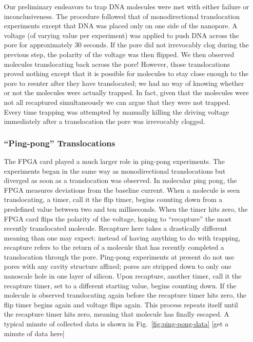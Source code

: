 \documentclass[aps,prl,preprint,groupedaddress]{revtex4}
\begin{document}
Our preliminary endeavors to trap DNA molecules were met with either failure or inconclusiveness.
The procedure followed that of monodirectional translocation experiments except that DNA was placed only on one side of the nanopore.
A voltage (of varying value per experiment) was applied to push DNA across the pore for approximately 30 seconds.
If the pore did not irrevocably clog during the previous step, the polarity of the voltage was then flipped.
We then observed molecules translocating back across the pore!
However, those translocations proved nothing except that it is possible for molecules to stay close enough to the pore to reenter after they have translocated; we had no way of knowing whether or not the molecules were actually trapped.
In fact, given that the molecules were not all recaptured simultaneously we can argue that they were not trapped.
Every time trapping was attempted by manually killing the driving voltage immediately after a translocation the pore was irrevocably clogged.

\subsubsection{``Ping-pong'' Translocations}

The FPGA card played a much larger role in ping-pong experiments.
The experiments began in the same way as monodirectional translocations but diverged as soon as a translocation was observed.
In molecular ping pong, the FPGA measures deviations from the baseline current.
When a molecule is seen translocating, a timer, call it the flip timer, begins counting down from a predefined value between two and ten milliseconds.
When the timer hits zero, the FPGA card flips the polarity of the voltage, hoping to ``recapture'' the most recently translocated molecule.
Recapture here takes a drastically different meaning than one may expect: instead of having anything to do with trapping, recapture refers to the return of a molecule that has recently completed a translocation through the pore.
Ping-pong experiments at present do not use pores with any cavity structure affixed; pores are stripped down to only one nanoscale hole in one layer of silicon.
Upon recapture, another timer, call it the recapture timer, set to a different starting value, begins counting down.
If the molecule is observed translocating again before the recapture timer hits zero, the flip timer begins again and voltage flips again.
This process repeats itself until the recapture timer hits zero, meaning that molecule has finally escaped.
A typical minute of collected data is shown in Fig.~\ref{fig:ping-pong-data} [get a minute of data here]
\end{document}
